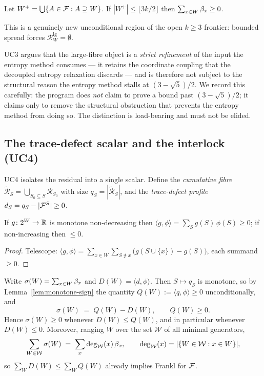 \begin{corollary}
\label{cor:bounded-spread}
Let $W^+=\bigcup\{A\in\mathcal{F}:A\supseteq W\}$. If $|W^+|\le\lfloor
3k/2\rfloor$ then $\sum_{x\in W}\beta_x\ge0$.
\end{corollary}

This is a genuinely new unconditional region of the open $k\ge3$
frontier: bounded spread forces $\mathcal R_W^{\mathrm{lg}}=\emptyset$.

\begin{remark}
\label{rem:past-sawin}
UC3 argues that the large-fibre object is a \emph{strict refinement} of
the input the entropy method consumes --- it retains the coordinate
coupling that the decoupled entropy relaxation discards --- and is
therefore not subject to the structural reason the entropy method
stalls at $(3-\sqrt5)/2$. We record this carefully: the program does
\emph{not} claim to prove a bound past $(3-\sqrt5)/2$; it claims only to
remove the structural obstruction that prevents the entropy method from
doing so. The distinction is load-bearing and must not be elided.
\end{remark}

\subsection{The trace-defect scalar and the interlock (UC4)}
\label{ssec:uc4}

UC4 isolates the residual into a single scalar. Define the
\emph{cumulative fibre} $\widetilde{\mathcal R}_S=\bigcup_{S_0\subseteq
S}\mathcal R_{S_0}$ with size $q_S=|\widetilde{\mathcal R}_S|$, and the
\emph{trace-defect profile} $d_S=q_S-|\mathcal{F}^S|\ge0$.

\begin{lemma}
\label{lem:monotone-sign}
If $g\colon2^W\to\mathbb{R}$ is monotone non-decreasing then $\langle
g,\phi\rangle=\sum_S g(S)\,\phi(S)\ge0$; if non-increasing then
$\le0$.
\end{lemma}

\begin{proof}
Telescope: $\langle g,\phi\rangle=\sum_{x\in W}\sum_{S\not\ni
x}\bigl(g(S\cup\{x\})-g(S)\bigr)$, each summand $\ge0$.
\end{proof}

\begin{theorem}
\label{thm:uc4-interlock}
Write $\sigma(W)=\sum_{x\in W}\beta_x$ and $D(W)=\langle d,\phi\rangle$.
Then $S\mapsto q_S$ is monotone, so by Lemma~\ref{lem:monotone-sign}
the quantity $Q(W):=\langle q,\phi\rangle\ge0$ unconditionally, and
\[
  \sigma(W)\;=\;Q(W)-D(W),\qquad Q(W)\ge0.
\]
Hence $\sigma(W)\ge0$ whenever $D(W)\le Q(W)$, and in particular
whenever $D(W)\le0$. Moreover, ranging $W$ over the set $\mathcal W$ of
all minimal generators,
\[
  \sum_{W\in\mathcal W}\sigma(W)\;=\;\sum_{x}\deg_{\mathcal W}(x)\,
  \beta_x,\qquad \deg_{\mathcal W}(x)=|\{W\in\mathcal W:x\in W\}|,
\]
so $\sum_{W}D(W)\le\sum_{W}Q(W)$ already implies Frankl for $\mathcal{F}$.
\end{theorem}

